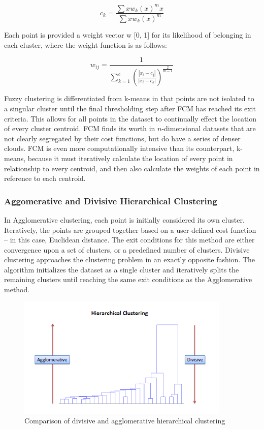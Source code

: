 \documentclass[12pt]{drexelthesis}
\let\Oldsubsubsection\subsubsection
\renewcommand{\subsubsection}{\FloatBarrier\Oldsubsubsection}
\begin{document}
\begin{equation}
	c_{k} = \frac{\sum{x}w_{k}(x)^{m}x}{\sum{x}w_{k}(x)^{m}}
\end{equation}

Each point is provided a weight vector w [0, 1] for its likelihood of belonging in each cluster, where the weight function is as follows:

\begin{equation}
	w_{ij} = \frac{1}{\sum_{k=1}^{c}(\frac{|x_{i}-c_{j}|}{|x_{i}-c_{k}|})^{\frac{2}{m-1}}}
\end{equation}

Fuzzy clustering is differentiated from k-means in that points are not isolated to a singular cluster until the final thresholding step after FCM has reached its exit criteria. This allows for all points in the dataset to continually effect the location of every cluster centroid. FCM finds its worth in $n$-dimensional datasets that are not clearly segregated by their cost functions, but do have a series of denser clouds. FCM is even more computationally intensive than its counterpart, k-means, because it must iteratively calculate the location of every point in relationship to every centroid, and then also calculate the weights of each point in reference to each centroid.

\subsubsection{Aggomerative and Divisive Hierarchical Clustering}
In Agglomerative clustering, each point is initially considered its own cluster. Iteratively, the points are grouped together based on a user-defined cost function – in this case, Euclidean distance. The exit conditions for this method are either convergence upon a set of clusters, or a predefined number of clusters.
Divisive clustering approaches the clustering problem in an exactly opposite fashion. The algorithm initializes the dataset as a single cluster and iteratively splits the remaining clusters until reaching the same exit conditions as the Agglomerative method.


\begin{figure}[!ht]
\centering
\includegraphics[width=4in]{divisiveAgglomerative.png}
\caption[Comparison of divisive and agglomerative clustering methods]{Comparison of divisive and agglomerative hierarchical clustering}
\end{figure}
\end{document}
